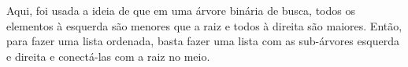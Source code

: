 Aqui, foi usada a ideia de que em uma árvore binária de busca, todos os elementos à
esquerda são menores que a raiz e todos à direita são maiores. Então, para fazer uma
lista ordenada, basta fazer uma lista com as sub-árvores esquerda e direita e
conectá-las com a raiz no meio.